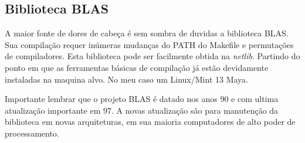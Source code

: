 \documentclass[paper=a4, fontsize=11pt]{article}
\begin{document}
\subsection{Biblioteca BLAS}

A maior fonte de dores de cabeça é sem sombra de duvidas a biblioteca BLAS. 
Sua compilação requer inúmeras mudanças do PATH do Makefile e permutações de
compiladores. Esta biblioteca pode ser facilmente obtida na \textit{netlib}.
Partindo do ponto em que as ferramentas básicas de compilação já estão
devidamente instaladas na maquina alvo. No meu caso um Linux/Mint 13 Maya.

Importante lembrar que o projeto BLAS é datado nos anos 90 e com ultima 
atualização importante em 97. A novas atualização são para manutenção da biblioteca
em novas arquiteturas, em sua maioria computadores de alto poder de processamento.
\end{document}
